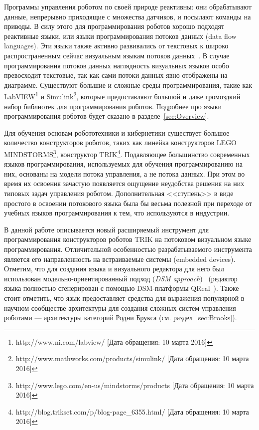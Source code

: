 \documentclass[conference]{IEEEtran}
\begin{document}
Программы управления роботом по своей природе реактивны: они обрабатывают данные, непрерывно приходящие с множества датчиков, и посылают команды на приводы. В силу этого для программирования роботов хорошо подходят реактивные языки, или языки программирования потоков данных (data flow languages). Эти языки также активно развивались от текстовых к широко распространенным сейчас визуальным языкам потоков данных~\cite{johnston2004advances}. В случае программирования потоков данных наглядность визуальных языков особо превосходит текстовые, так как сами потоки данных явно отображены на диаграмме. Существуют большие и сложные среды программирования, такие как LabVIEW\footnote{http://www.ni.com/labview/ [Дата обращения: 10 марта 2016]} и Simulink\footnote{http://www.mathworks.com/products/simulink/ [Дата обращения: 10 марта 2016]}, которые предоставляют большой и даже громоздкий набор библиотек для программирования роботов. Подробнее про языки программирования роботов будет сказано в разделе~\ref{sec:Overview}.

Для обучения основам робототехники и кибернетики существует большое количество конструкторов роботов, таких как линейка конструкторов LEGO MINDSTORMS\footnote{http://www.lego.com/en-us/mindstorms/products [Дата обращения: 10 марта 2016]}, конструктор TRIK\footnote{http://blog.trikset.com/p/blog-page\_6355.html/ [Дата обращения: 10 марта 2016]}.
Подавляющее большинство современных языков программирования, используемых для обучения программированию на них, основаны на модели потока управления, а не потока данных. При этом во время их освоения зачастую появляется ощущение неудобства решения на них типовых задач управления роботом. Дополнительная <<ступень>> в виде простого в освоении потокового языка была бы весьма полезной при переходе от учебных языков программирования к тем, что используются в индустрии. 

В данной работе описывается новый расширяемый инструмент для программирования конструкторов роботов TRIK на потоковом визуальном языке программирования. Отличительной особенностью разрабатываемого инструмента является его направленность на встраиваемые системы (embedded devices). Отметим, что для создания языка и визуального редактора для него был использован модельно-ориентированный подход (\textit{DSM approach})~\cite{koznov2008} (редактор языка полностью сгенерирован с помощью DSM-платформы QReal~\cite{qrealMeta,kuzenkova2013qreal}). Также стоит отметить, что язык предоставляет средства для выражения популярной в научном сообществе архитектуры для создания сложных систем управления роботами --- архитектуры категорий Родни Брукса (см. раздел~\ref{sec:Brooks}).
\end{document}
